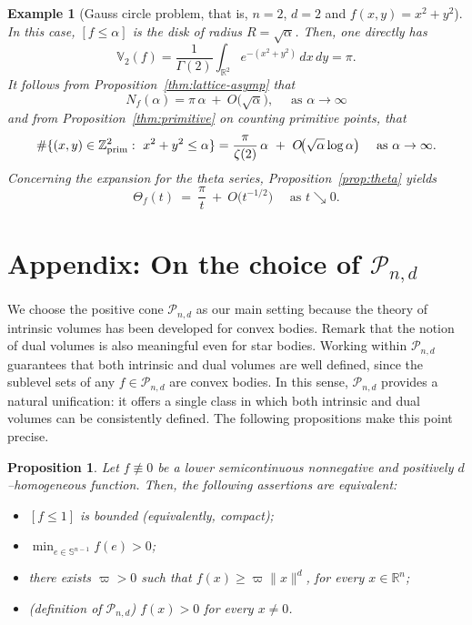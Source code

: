 \documentclass[11pt]{article}
\newtheorem{proposition}[theorem]{Proposition}
\newtheorem{example}[theorem]{Example}
\theoremstyle{definition}
\numberwithin{equation}{section}
\newcommand{\R}{\mathbb{R}}
\newcommand{\Z}{\mathbb{Z}}
\newcommand{\Sph}{\mathbb{S}}        %
\newcommand{\cP}{\mathcal{P}}        %
\newcommand{\opV}{\mathds{V}}       %
\begin{document}
\begin{example}[Gauss circle problem, that is, $n=2$, $d=2$ and $f(x, y) = x^2+y^2$]\label{ex:circle}\normalfont
In this case, $[f\le\alpha]$ is the disk of radius ${R=\sqrt\alpha}$.
Then, one directly has
\[
\opV_2(f)=\frac{1}{\Gamma(2)}\int_{\R^2} e^{-(x^2+y^2)}\,dx\,dy=\pi.
\]
It follows from Proposition~\ref{thm:lattice-asymp} that
\[
N_f(\alpha)=\pi\,\alpha\ +\ O\!\big(\sqrt\alpha\big), \quad \text{ as $\alpha \to \infty$}
\]
and from Proposition~\ref{thm:primitive} on counting primitive points, that
\[
\#\{(x,y)\in\Z^2_{\rm prim}:\ x^2+y^2\le\alpha\}
=\frac{\pi}{\zeta(2)}\,\alpha\ +\ O \!\big(\sqrt\alpha\log\alpha\big) \quad \text{ as $\alpha \to \infty$}.
\]
Concerning the expansion for the theta series, Proposition~\ref{prop:theta} yields
\[
\Theta_f(t)\ =\ \frac{\pi}{t}\ +\ O\!\big(t^{-1/2}\big) \quad \text{ as } t \searrow 0.
\]
\end{example}

\appendix

\section{Appendix: On the choice of $\cP_{n, d}$}
We choose the positive cone $\cP_{n,d}$ as our main setting because the theory of intrinsic volumes has been developed for convex bodies.
Remark that the notion of dual volumes is also meaningful even for star bodies. 
Working within $\cP_{n,d}$ guarantees that both intrinsic and dual volumes are well defined, since the sublevel sets of any $f \in \cP_{n,d}$ are convex bodies. 
In this sense, $\cP_{n,d}$ provides a natural unification: it offers a single class in which both intrinsic and dual volumes can be consistently defined.
The following propositions make this point precise.

\begin{proposition}\label{prop.cF-coer}
Let $f \not\equiv 0$ be a lower semicontinuous nonnegative and positively $d$--homogeneous function.
Then, the following assertions are equivalent:
\begin{itemize}
	\item[(i)] $[f \leq 1]$ is bounded (equivalently, compact);
	\item[(ii)] $\textstyle\min_{e \in \Sph^{n - 1}} f(e) > 0$;
	\item[(iii)] there exists $\varpi > 0$ such that $f(x) \geq \varpi \| x \|^d$, for every $x \in \R^n$;
	\item[(iv)] (definition of $\cP_{n, d}$) $f(x) > 0$ for every $x \neq 0$.
\end{itemize}
\end{proposition}
\end{document}

